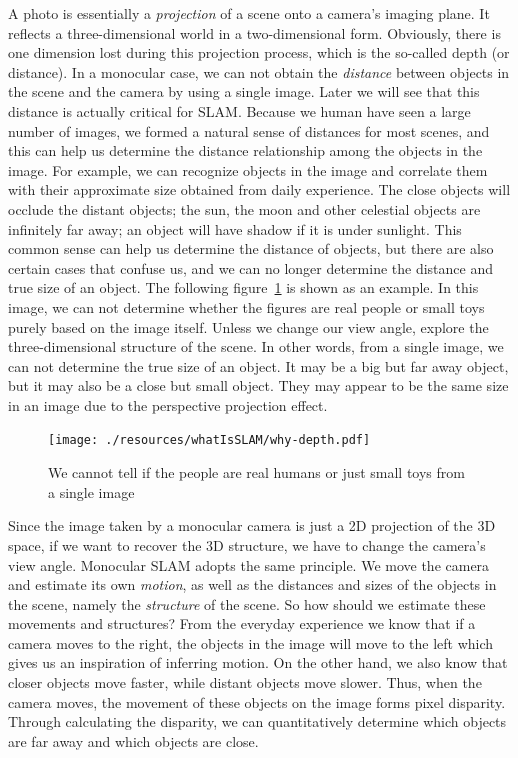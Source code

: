 A photo is essentially a \emph{projection} of a scene onto a camera's imaging plane. It reflects a three-dimensional world in a two-dimensional form. Obviously, there is one dimension lost during this projection process, which is the so-called depth (or distance). In a monocular case, we can not obtain the \emph{distance} between objects in the scene and the camera by using a single image. Later we will see that this distance is actually critical for SLAM. Because we human have seen a large number of images, we formed a natural sense of distances for most scenes, and this can help us determine the distance relationship among the objects in the image. For example, we can recognize objects in the image and correlate them with their approximate size obtained from daily experience. The close objects will occlude the distant objects; the sun, the moon and other celestial objects are infinitely far away; an object will have shadow if it is under sunlight. This common sense can help us determine the distance of objects, but there are also certain cases that confuse us, and we can no longer determine the distance and true size of an object. The following figure~\ref{fig:why-depth} is shown as an example. In this image, we can not determine whether the figures are real people or small toys purely based on the image itself. Unless we change our view angle, explore the three-dimensional structure of the scene. In other words, from a single image, we can not determine the true size of an object. It may be a big but far away object, but it may also be a close but small object. They may appear to be the same size in an image due to the perspective projection effect.

\begin{figure}
	\centering
	\texttt{[image: ./resources/whatIsSLAM/why-depth.pdf]}
	\caption{We cannot tell if the people are real humans or just small toys from a single image}
	\label{fig:why-depth}
\end{figure}

Since the image taken by a monocular camera is just a 2D projection of the 3D space, if we want to recover the 3D structure, we have to change the camera's view angle. Monocular SLAM adopts the same principle. We move the camera and estimate its own \emph{motion}, as well as the distances and sizes of the objects in the scene, namely the \emph{structure} of the scene. So how should we estimate these movements and structures? From the everyday experience we know that if a camera moves to the right, the objects in the image will move to the left which gives us an inspiration of inferring motion. On the other hand, we also know that closer objects move faster, while distant objects move slower. Thus, when the camera moves, the movement of these objects on the image forms pixel disparity. Through calculating the disparity, we can quantitatively determine which objects are far away and which objects are close.

